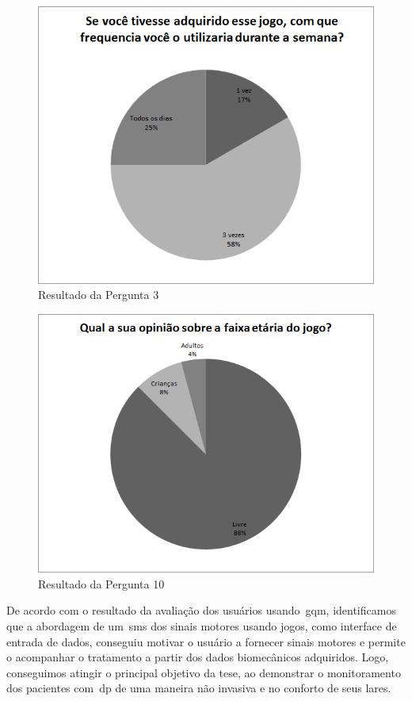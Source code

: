 \begin{figure}[!htb]
     \centering
     \includegraphics[scale=0.7]{./img/chart_3-.png}
     \caption{Resultado da Pergunta 3}
     \label{fig:question3}
\end{figure}


\begin{figure}[!htb]
     \centering
     \includegraphics[scale=0.7]{./img/chart_10-.png}
     \caption{Resultado da Pergunta 10}
     \label{fig:question10}
\end{figure}
\FloatBarrier

De acordo com o resultado da avaliação dos usuários usando~\ac{gqm}, identificamos que a abordagem de um~\ac{sms} dos sinais motores usando jogos, como interface de entrada de dados, conseguiu motivar o usuário  a fornecer sinais motores e permite o acompanhar o tratamento a partir dos dados biomecânicos adquiridos. Logo, conseguimos atingir o principal objetivo da tese, ao demonstrar o monitoramento dos pacientes com~\ac{dp} de uma maneira não invasiva e no conforto de seus lares.






